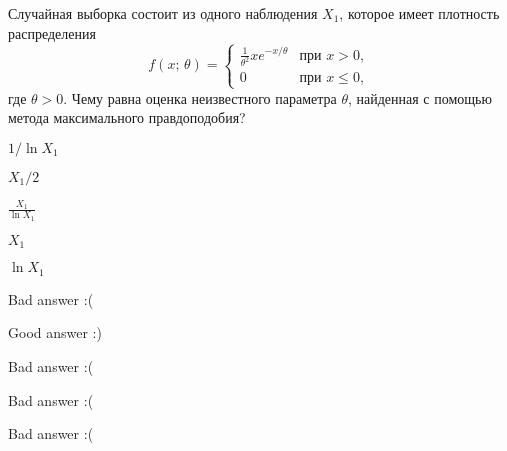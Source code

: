 
\begin{question}
Случайная выборка состоит из одного наблюдения \(X_1\), которое имеет
плотность распределения \[
f(x; \, \theta) = \begin{cases}
    \tfrac{1}{\theta^2} x e^{-x/\theta} & \text{при } x > 0,  \\
    0 & \text{при }x\leq 0,
  \end{cases}
\] где \(\theta > 0\). Чему равна оценка неизвестного параметра
\(\theta\), найденная с помощью метода максимального правдоподобия?
\begin{answerlist}
  \item \(1 / \ln X_1\)
  \item \(X_1 / 2\)
  \item \(\frac{X_1}{\ln X_1}\)
  \item \(X_1\)
  \item \(\ln X_1\)
\end{answerlist}
\end{question}

\begin{solution}
\begin{answerlist}
  \item Bad answer :(
  \item Good answer :)
  \item Bad answer :(
  \item Bad answer :(
  \item Bad answer :(
\end{answerlist}
\end{solution}

